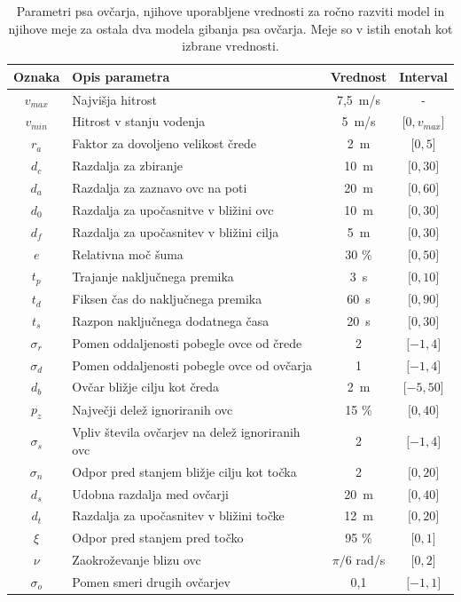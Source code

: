 \begin{table}[ht]
	\begin{center}
		\begin{tabular}{ c|l|c|c }
			\hline
			\textbf{Oznaka} & \textbf{Opis parametra} & \textbf{Vrednost} & \textbf{Interval} \\ \hline  
			$v_{max}$ & Najvišja hitrost & 7,5~m/s & - \\
			$v_{min}$ & Hitrost v stanju vodenja & 5~m/s & $\lbrack 0, v_{max} \rbrack$ \\
			$r_a$ & Faktor za dovoljeno velikost črede & 2~m & $\lbrack 0, 5 \rbrack$ \\
			$d_c$ & Razdalja za zbiranje & 10~m & $\lbrack 0, 30 \rbrack$ \\
			$d_a$ & Razdalja za zaznavo ovc na poti & 20~m & $\lbrack 0, 60 \rbrack$ \\
			$d_0$ & Razdalja za upočasnitve v bližini ovc & 10~m & $\lbrack 0, 30 \rbrack$ \\
			$d_f$ & Razdalja za upočasnitev v bližini cilja & 5~m & $\lbrack 0, 30 \rbrack$ \\
			$e$ & Relativna moč šuma & 30 \% & $\lbrack 0, 50 \rbrack$ \\
			$t_p$ & Trajanje naključnega premika & 3~s & $\lbrack 0, 10 \rbrack$ \\
			$t_d$ & Fiksen čas do naključnega premika & 60~s & $\lbrack 0, 90 \rbrack$ \\
			$t_s$ & Razpon naključnega dodatnega časa & 20~s & $\lbrack 0, 30 \rbrack$ \\
			$\sigma_r$ & Pomen oddaljenosti pobegle ovce od črede & 2 & $\lbrack -1, 4 \rbrack$ \\
			$\sigma_d$ & Pomen oddaljenosti pobegle ovce od ovčarja & 1 & $\lbrack -1, 4 \rbrack$ \\
			$d_b$ & Ovčar bližje cilju kot čreda & 2~m & $\lbrack -5, 50 \rbrack$ \\
			$p_z$ & Največji delež ignoriranih ovc & 15 \% & $\lbrack 0, 40 \rbrack$ \\
			$\sigma_s$ & Vpliv števila ovčarjev na delež ignoriranih ovc & 2 & $\lbrack -1, 4 \rbrack$ \\
			$\sigma_n$ & Odpor pred stanjem bližje cilju kot točka & 2 & $\lbrack 0, 20 \rbrack$ \\
			$d_s$ & Udobna razdalja med ovčarji & 20~m & $\lbrack 0, 40 \rbrack$ \\
			$d_t$ & Razdalja za upočasnitev v bližini točke & 12~m & $\lbrack 0, 20 \rbrack$ \\
			$\xi$ & Odpor pred stanjem pred točko & 95 \% & $\lbrack 0, 1 \rbrack$ \\
			$\nu$ & Zaokroževanje blizu ovc & $\pi / 6$ rad/s & $\lbrack 0, 2 \rbrack$ \\
			$\sigma_o$ & Pomen smeri drugih ovčarjev & 0,1 & $\lbrack -1, 1 \rbrack$ \\
			\hline
		\end{tabular}
	\end{center}
	\caption[Parametri vodenja psa ovčarja]{Parametri psa ovčarja, njihove uporabljene vrednosti za ročno razviti model in njihove meje za ostala dva modela gibanja psa ovčarja. Meje so v istih enotah kot izbrane vrednosti.}
	\label{table:ovcar}
\end{table}
